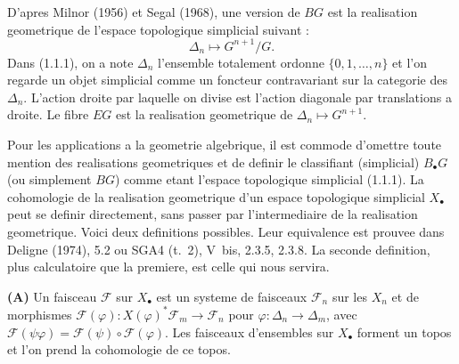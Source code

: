 \documentclass[11pt,a4paper]{article}
\theoremstyle{plain}
\theoremstyle{definition}
\begin{document}
D'apres Milnor (1956) et Segal (1968), une version de $BG$ est la realisation geometrique de l'espace topologique simplicial suivant :
\begin{equation}\label{1.1.1}
\Delta_n \mapsto G^{n+1}/G.
\end{equation}
Dans (1.1.1), on a note $\Delta_n$ l'ensemble totalement ordonne $\{0, 1, \ldots, n\}$ et l'on regarde un objet simplicial comme un foncteur contravariant sur la categorie des $\Delta_n$. L'action droite par laquelle on divise est l'action diagonale par translations a droite. Le fibre $EG$ est la realisation geometrique de $\Delta_n \mapsto G^{n+1}$.

Pour les applications a la geometrie algebrique, il est commode d'omettre toute mention des realisations geometriques et de definir le classifiant (simplicial) $B_\bullet G$ (ou simplement $BG$) comme etant l'espace topologique simplicial (1.1.1). La cohomologie de la realisation geometrique d'un espace topologique simplicial $X_\bullet$ peut se definir directement, sans passer par l'intermediaire de la realisation geometrique. Voici deux definitions possibles. Leur equivalence est prouvee dans Deligne (1974), 5.2 ou SGA4 (t.~2), V~bis, 2.3.5, 2.3.8. La seconde definition, plus calculatoire que la premiere, est celle qui nous servira.

\textbf{(A)} Un faisceau $\mathscr{F}$ sur $X_\bullet$ est un systeme de faisceaux $\mathscr{F}_n$ sur les $X_n$ et de morphismes $\mathscr{F}(\varphi) : X(\varphi)^* \mathscr{F}_m \to \mathscr{F}_n$ pour $\varphi : \Delta_n \to \Delta_m$, avec $\mathscr{F}(\psi\varphi) = \mathscr{F}(\psi) \circ \mathscr{F}(\varphi)$. Les faisceaux d'ensembles sur $X_\bullet$ forment un topos et l'on prend la cohomologie de ce topos.
\end{document}
